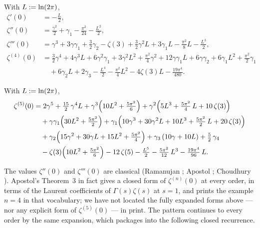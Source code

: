 \begin{proposition}[jets at $0$]\label{stieltjes:prop:jets0}
With $L:=\ln(2\pi)$,
\begin{align*}
\zeta'(0)&=-\tfrac{L}{2},\\
\zeta''(0)&=\tfrac{\gamma^2}{2}+\gamma_1-\tfrac{\pi^2}{24}-\tfrac{L^2}{2},\\
\zeta'''(0)&=\gamma^3+3\gamma\gamma_1+\tfrac32\gamma_2-\zeta(3)
+\tfrac32\gamma^2L+3\gamma_1L-\tfrac{\pi^2}{8}L-\tfrac{L^3}{2},\\
\zeta^{(4)}(0)&=\tfrac32\gamma^4+4\gamma^3L+6\gamma^2\gamma_1+3\gamma^2L^2
+\tfrac{\pi^2}{4}\gamma^2+12\gamma\gamma_1L+6\gamma\gamma_2
+6\gamma_1L^2+\tfrac{\pi^2}{2}\gamma_1\\
&\quad+6\gamma_2L+2\gamma_3
-\tfrac{L^4}{2}-\tfrac{\pi^2}{4}L^2-4\zeta(3)L-\tfrac{19\pi^4}{480}.
\end{align*}
\end{proposition}

\begin{proposition}\label{stieltjes:prop:jets0def}
With $L:=\ln(2\pi)$,
\begin{align*}
\zeta^{(5)}(0)
&=2\gamma^5+\tfrac{15}{2}\,\gamma^4L
+\gamma^3\Bigl(10L^2+\tfrac{5\pi^2}{6}\Bigr)
+\gamma^2\Bigl(5L^3+\tfrac{5\pi^2}{4}\,L+10\,\zeta(3)\Bigr)\\
&\quad+\gamma\gamma_1\Bigl(30L^2+\tfrac{5\pi^2}{2}\Bigr)
+\gamma_1\Bigl(10\gamma^3+30\gamma^2L+10L^3+\tfrac{5\pi^2}{2}\,L+20\,\zeta(3)\Bigr)\\
&\quad+\gamma_2\Bigl(15\gamma^2+30\gamma L+15L^2+\tfrac{5\pi^2}{4}\Bigr)
+\gamma_3\,(10\gamma+10L)+\tfrac52\,\gamma_4\\
&\quad-\zeta(3)\Bigl(10L^2+\tfrac{5\pi^2}{6}\Bigr)-12\,\zeta(5)
-\tfrac{L^5}{2}-\tfrac{5\pi^2}{12}\,L^3-\tfrac{19\pi^4}{96}\,L .
\end{align*}
\end{proposition}

The values $\zeta''(0)$ and $\zeta'''(0)$ are classical (Ramanujan
\cite{stieltjes:Berndt}; Apostol \cite{stieltjes:Apostol85}; Choudhury \cite{stieltjes:Choudhury}).
Apostol's Theorem~3 \cite{stieltjes:Apostol85} in fact gives a closed form of
$\zeta^{(n)}(0)$ at every order, in terms of the Laurent coefficients of
$\Gamma(s)\zeta(s)$ at $s=1$, and prints the example $n=4$ in that
vocabulary; we have not located the fully expanded forms above — nor any
explicit form of $\zeta^{(5)}(0)$ — in print. The pattern continues to
every order by the same expansion, which packages into the following
closed recurrence.

